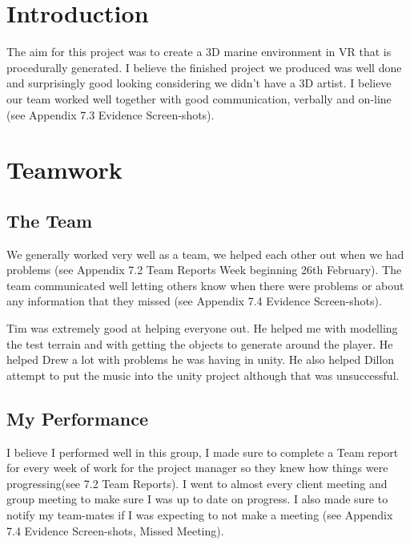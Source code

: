 \documentclass[10pt, a4paper]{article}
\title{\mytitle}
\author{\myauthor\hspace{1em}\\\contact\\Edinburgh Napier University\hspace{0.5em}-\hspace{0.5em}\mymodule}
\date{}
\begin{document}
	\maketitle
	\section{Introduction}
	
	The aim for this project was to create a 3D marine environment in VR that is procedurally generated. I believe the finished project we produced was well done and surprisingly good looking considering we didn't have a 3D artist. I believe our team worked well together with good communication, verbally and on-line (see Appendix 7.3 Evidence Screen-shots).
	
	\section{Teamwork}
	\subsection{The Team}
	
	We generally worked very well as a team, we helped each other out when we had problems (see Appendix 7.2 Team Reports Week beginning 26th February). The team communicated well letting others know when there were problems or about any information that they missed (see Appendix 7.4 Evidence Screen-shots).
	
	Tim was extremely good at helping everyone out. He helped me with modelling the test terrain and with getting the objects to generate around the player. He helped Drew a lot with problems he was having in unity. He also helped Dillon attempt to put the music into the unity project although that was unsuccessful.
	
	\subsection{My Performance}
	
	I believe I performed well in this group, I made sure to complete a Team report for every week of work for the project manager so they knew how things were progressing(see 7.2 Team Reports). I went to almost every client meeting and group meeting to make sure I was up to date on progress. I also made sure to notify my team-mates if I was expecting to not make a meeting (see Appendix 7.4 Evidence Screen-shots, Missed Meeting).
	
\end{document}
